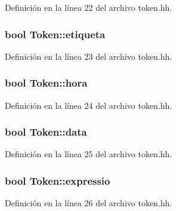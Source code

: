 Definición en la línea 22 del archivo token.\-hh.

\hypertarget{class_token_a7d8393d74f62678dca433bde9957ba8e}{
\subsubsection[{etiqueta}]{\setlength{\rightskip}{0pt plus 5cm}bool Token\-::etiqueta\hspace{0.3cm}{\ttfamily [private]}}}\label{class_token_a7d8393d74f62678dca433bde9957ba8e}


Definición en la línea 23 del archivo token.\-hh.

\hypertarget{class_token_a64b32630460ba9c9e43b0ab4954e346d}{
\subsubsection[{hora}]{\setlength{\rightskip}{0pt plus 5cm}bool Token\-::hora\hspace{0.3cm}{\ttfamily [private]}}}\label{class_token_a64b32630460ba9c9e43b0ab4954e346d}


Definición en la línea 24 del archivo token.\-hh.

\hypertarget{class_token_af793ed1062684808c32526e66c0317da}{
\subsubsection[{data}]{\setlength{\rightskip}{0pt plus 5cm}bool Token\-::data\hspace{0.3cm}{\ttfamily [private]}}}\label{class_token_af793ed1062684808c32526e66c0317da}


Definición en la línea 25 del archivo token.\-hh.

\hypertarget{class_token_a2f7bd6d2dc4ec43eeeb803c7ec66c4a9}{
\subsubsection[{expressio}]{\setlength{\rightskip}{0pt plus 5cm}bool Token\-::expressio\hspace{0.3cm}{\ttfamily [private]}}}\label{class_token_a2f7bd6d2dc4ec43eeeb803c7ec66c4a9}


Definición en la línea 26 del archivo token.\-hh.

